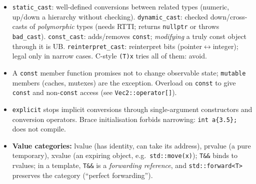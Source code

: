 \documentclass[10pt,a4paper,openany,oneside]{report}
\begin{document}
\begin{mustbox}
\begin{itemize}[nosep]
\item \texttt{static\_cast}: well-defined conversions between related types (numeric, up/down a hierarchy without checking). \texttt{dynamic\_cast}: checked down/cross-casts of \emph{polymorphic} types (needs RTTI; returns \texttt{nullptr} or throws \texttt{bad\_cast}). \texttt{const\_cast}: adds/removes \texttt{const}; \emph{modifying} a truly const object through it is UB. \texttt{reinterpret\_cast}: reinterpret bits (pointer$\leftrightarrow$integer); legal only in narrow cases. C-style \texttt{(T)x} tries all of them: avoid.
\item A \texttt{const} member function promises not to change observable state; \texttt{mutable} members (caches, mutexes) are the exception. Overload on \texttt{const} to give \texttt{const} and non-\texttt{const} access (see \texttt{Vec2::operator[]}).
\item \texttt{explicit} stops implicit conversions through single-argument constructors and conversion operators. Brace initialisation forbids narrowing: \texttt{int a\{3.5\};} does not compile.
\item \textbf{Value categories:} lvalue (has identity, can take its address), prvalue (a pure temporary), xvalue (an expiring object, e.g.\ \texttt{std::move(x)}); \texttt{T\&\&} binds to rvalues; in a template, \texttt{T\&\&} is a \emph{forwarding reference}, and \texttt{std::forward<T>} preserves the category (``perfect forwarding'').
\end{itemize}
\end{mustbox}
\end{document}
